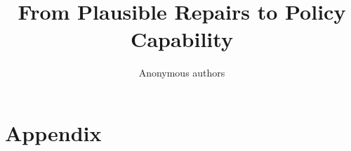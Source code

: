 \documentclass{article}
\title{From Plausible Repairs to Policy Capability}
\author{Anonymous authors}
\begin{document}
\maketitle







\label{maintextend}
\clearpage
{}
{}
\label{statementsstart}

\clearpage
{}
{}
\label{referencesstart}


\clearpage
\appendix
{}
{}
\section*{Appendix}
\label{appendixstart}

\clearpage



\end{document}

